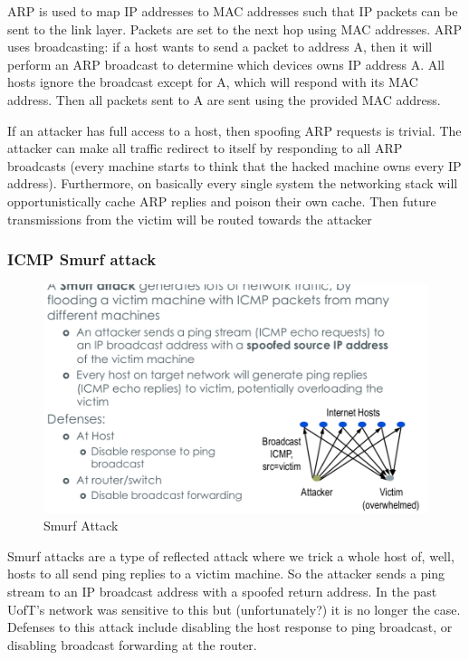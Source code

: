 \documentclass[../notes.tex]{subfiles}
\begin{document}
ARP is used to map IP addresses to MAC addresses such that IP packets can be sent to the link layer. Packets are set to the next hop using MAC addresses. 
ARP uses broadcasting: if a host wants to send a packet to address A, then it will perform an ARP broadcast to determine which devices owns IP address A. All hosts ignore the broadcast except for A, which will respond with its MAC address. Then all packets sent to A are sent using the provided MAC address.

If an attacker has full access to a host, then spoofing ARP requests is trivial. The attacker can make all traffic redirect to itself by responding to all ARP broadcasts (every machine starts to think that the hacked machine owns every IP address). 
Furthermore, on basically every single system the networking stack will opportunistically cache ARP replies and poison their own cache.
Then future transmissions from the victim will be routed towards the attacker

\subsubsection{ICMP Smurf attack}

\begin{figure}[H]
    \centering
    \includegraphics[width=0.8\linewidth]{img/image_2023-03-28-16-47-45.png}
    \caption{Smurf Attack}
\end{figure}

Smurf attacks are a type of reflected attack where we trick a whole host of, well, hosts to all send ping replies to a victim machine. So the attacker sends a ping stream to an IP broadcast address with a spoofed return address.
In the past UofT's network was sensitive to this but (unfortunately?) it is no longer the case.
Defenses to this attack include disabling the host response to ping broadcast, or disabling broadcast forwarding at the router.
\end{document}
